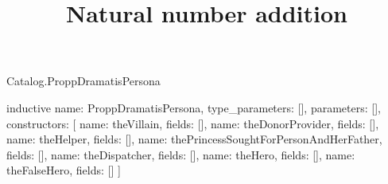 \begin{lexlean}{Catalog.ProppDramatisPersona}
\title{Natural number addition}
\begin{semanticmodule}
inductive{
  name: ProppDramatisPersona,
  type_parameters: [],
  parameters: [],
  constructors: [
    {name: theVillain, fields: []},
    {name: theDonorProvider, fields: []},
    {name: theHelper, fields: []},
    {name: thePrincessSoughtForPersonAndHerFather, fields: []},
    {name: theDispatcher, fields: []},
    {name: theHero, fields: []},
    {name: theFalseHero, fields: []}
  ]
}
\end{semanticmodule}
\end{lexlean}
